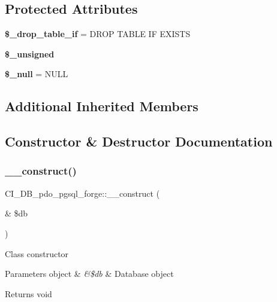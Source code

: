 \subsection*{Protected Attributes}
\begin{DoxyCompactItemize}
\item 
\mbox{\label{class_c_i___d_b__pdo__pgsql__forge_ad310aa5d35528d8fc0269fd69a09997c}} 
{\bfseries \$\+\_\+drop\+\_\+table\+\_\+if} = \textquotesingle{}D\+R\+OP T\+A\+B\+LE IF E\+X\+I\+S\+TS\textquotesingle{}
\item 
{\bfseries \$\+\_\+unsigned}
\item 
\mbox{\label{class_c_i___d_b__pdo__pgsql__forge_a46518aaf9a3beff090970466871ea661}} 
{\bfseries \$\+\_\+null} = \textquotesingle{}N\+U\+LL\textquotesingle{}
\end{DoxyCompactItemize}
\subsection*{Additional Inherited Members}


\subsection{Constructor \& Destructor Documentation}
\mbox{\label{class_c_i___d_b__pdo__pgsql__forge_a7209229a936b502173afb845f1785cbd}} 
\subsubsection{\texorpdfstring{\+\_\+\+\_\+construct()}{\_\_construct()}}
{\footnotesize\ttfamily C\+I\+\_\+\+D\+B\+\_\+pdo\+\_\+pgsql\+\_\+forge\+::\+\_\+\+\_\+construct (\begin{DoxyParamCaption}\item[{\&}]{\$db }\end{DoxyParamCaption})}

Class constructor


\begin{DoxyParams}[1]{Parameters}
object & {\em \&\$db} & Database object \\
\hline
\end{DoxyParams}
\begin{DoxyReturn}{Returns}
void 
\end{DoxyReturn}


